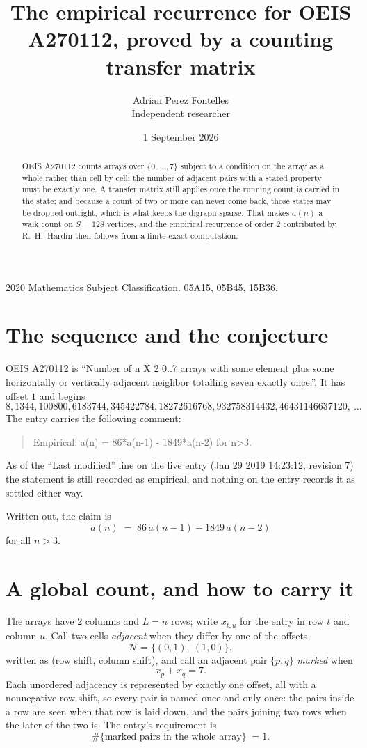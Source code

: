 \documentclass[11pt,a4paper]{article}
\title{The empirical recurrence for OEIS A270112, proved by a counting transfer matrix}
\author{Adrian Perez Fontelles\\ \small Independent researcher}
\date{1 September 2026}
\theoremstyle{plain}
\theoremstyle{definition}
\begin{document}
\maketitle

\begin{abstract}
OEIS A270112 counts arrays over $\{0,\dots,7\}$ subject to a condition on the array as a
whole rather than cell by cell: the number of adjacent pairs with a stated property must be
exactly one. A transfer matrix still applies once the running count is carried in the state; and
because a count of two or more can never come back, those states may be dropped outright,
which is what keeps the digraph sparse. That makes $a(n)$ a walk count on $S=128$ vertices,
and the empirical recurrence of order $2$ contributed by R.~H.~Hardin then follows from
a finite exact computation.
\end{abstract}

\noindent\small 2020 Mathematics Subject Classification. 05A15, 05B45, 15B36.\normalsize

\section{The sequence and the conjecture}

OEIS A270112 is ``Number of n X 2 0..7 arrays with some element plus some horizontally or vertically adjacent neighbor totalling seven exactly once.''. It has offset $1$ and begins
\[
8, 1344, 100800, 6183744, 345422784, 18272616768, 932758314432, 46431146637120,\ \dots
\]
The entry carries the following comment:
\begin{quote}\small
Empirical: a(n) = 86*a(n-1) - 1849*a(n-2) for n>3.
\end{quote}
As of the ``Last modified'' line on the live entry (Jan 29 2019 14:23:12, revision 7) the statement is
still recorded as empirical, and nothing on the entry records it as settled either way.

Written out, the claim is
\begin{equation}\label{eq:conj}
a(n)\;=\;86\,a(n-1) - 1849\,a(n-2)
\end{equation}
for all $n>3$.

\section{A global count, and how to carry it}

The arrays have $2$ columns and $L=n$ rows; write $x_{t,u}$ for the entry in
row $t$ and column $u$. Call two cells \emph{adjacent} when they differ by one of the
offsets
\[
\mathcal N=\{(0,1),\ (1,0)\},
\]
written as (row shift, column shift), and call an adjacent pair $\{p,q\}$
\emph{marked} when
\[
x_{p}+x_{q}=7 .
\]
Each unordered adjacency is represented by exactly one offset, all with a nonnegative row
shift, so every pair is named once and only once: the pairs inside a row are seen when
that row is laid down, and the pairs joining two rows when the later of the two is. The
entry's requirement is
\begin{equation}\label{eq:glob}
\#\{\text{marked pairs in the whole array}\}\;=1.
\end{equation}
\end{document}

